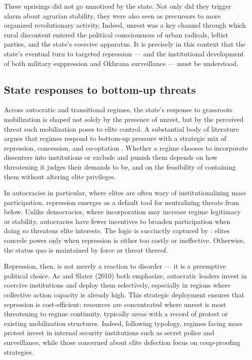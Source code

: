 \documentclass[10pt]{scrarticle}
\begin{document}
These uprisings did not go unnoticed by the state. Not only did they trigger alarm about agrarian stability, they were also seen as precursors to more organized revolutionary activity. Indeed, unrest was a key channel through which rural discontent entered the political consciousness of urban radicals, leftist parties, and the state’s coercive apparatus. It is precisely in this context that the state’s eventual turn to targeted repression — and the institutional development of both military suppression and Okhrana surveillance — must be understood.


\subsection{State responses to bottom-up threats}

Across autocratic and transitional regimes, the state’s response to grassroots mobilization is shaped not solely by the presence of unrest, but by the perceived threat such mobilization poses to elite control. A substantial body of literature argues that regimes respond to bottom-up pressure with a strategic mix of repression, concession, and co-optation \parencite{tilly_mobilization_1978,davenport_state_2007,gandhi_authoritarian_2007}. Whether a regime chooses to incorporate dissenters into institutions or exclude and punish them depends on how threatening it judges their demands to be, and on the feasibility of containing them without altering elite privileges.

In autocracies in particular, where elites are often wary of institutionalizing mass participation, repression emerges as a default tool for neutralizing threats from below. Unlike democracies, where incorporation may increase regime legitimacy or stability, autocracies have fewer incentives to broaden participation when doing so threatens elite interests. The logic is succinctly captured by \cite{acemoglu_economic_2005}: elites concede power only when repression is either too costly or ineffective. Otherwise, the status quo is maintained by force or threat thereof.

Repression, then, is not merely a reaction to disorder — it is a preemptive political choice. As \cite{greitens_dictators_2016} and Slater (2010) both emphasize, autocratic leaders invest in coercive institutions and deploy them selectively, especially in regions where collective action capacity is already high. This strategic deployment ensures that repression is cost-efficient: resources are concentrated where unrest is most threatening to regime continuity, typically areas with a record of protest or existing mobilization structures. Indeed, following \cite{greitens_dictators_2016} typology, regimes facing mass protest invest in internal security institutions such as secret police and surveillance, while those concerned about elite defection focus on coup-proofing strategies. 
\end{document}
